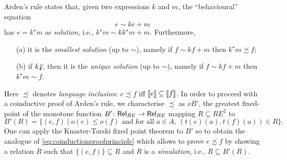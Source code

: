 \documentclass[smallcondensed,envcountsect,envcountsame]{svjour3}     %
\begin{document}
Arden's rule states that, given two expressions $k$ and $m$, the
``behavioural'' equation
 	 $$e \sim k e+m$$ 
	 has $e=k^\star m$ as \emph{solution}, i.e., $k^\star m \sim k k^\star m +m$.
         Furthermore,
	 \begin{enumerate}
         \item[(a)] it is the \emph{smallest solution} (up to $\sim$), namely if $f \sim k f+m$ then
           $k^\star m \precsim f$;
         \item[(b)] if $k{\not\downarrow}$, then it is the \emph{unique
             solution} (up to $\sim$), namely if $f \sim k f+m$ then
           $k^\star m \sim f$.
         \end{enumerate}
         Here $\precsim$ denotes \emph{language inclusion}: $e
         \precsim f$ iff $[\![ e ]\!]\subseteq [\![ f ]\!]$. In order to proceed
         with a coinductive proof of Arden's rule, we
         characterise $\precsim$ as $\nu B'$, the greatest fixed-point
         of the monotone function $B' \colon \mathsf{Rel}_{RE} \to \mathsf{Rel}_{RE}$
         mapping $R\subseteq RE^2$ to
$$B'(R)=\{(e,f) \mid o(e)\leq o(f) \text{ and for all } a\in A, \, (t(e)(a), t(f)(a))\in R  \}\text{.}$$
One can apply the Knaster-Tarski fixed point theorem to $B'$ so to
obtain the analogue of \eqref{eq:coinductionproofprinciple} which
allows to prove $e \precsim f$ by showing a relation $R$ such that
$\{(e,f)\}\subseteq R$ and $R$ is a \emph{simulation}, i.e.,
$R\subseteq B'(R)$.


\medskip
\end{document}
